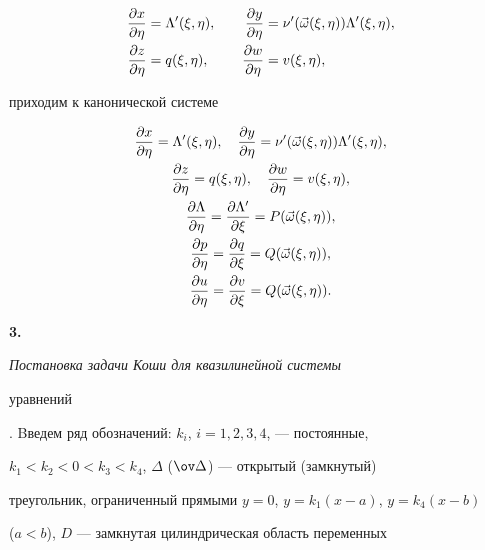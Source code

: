 \begin{alignat*}{2} 


\myfrac{x}{\eta}&=\Lambda'(\xi,\eta), &\quad 


\myfrac{y}{\eta}&=\nu'(\Vec\omega(\xi,\eta)) 


\Lambda'(\xi,\eta), \\ 


% 


\myfrac{z}{\eta}&=q(\xi,\eta), &\quad 


\myfrac{w}{\eta}&=v(\xi,\eta), 


\end{alignat*} 


приходим к канонической системе 


\begin{gather} 


\myfrac{x}{\eta}=\Lambda'(\xi,\eta),\quad 


\myfrac{y}{\eta}=\nu'(\Vec\omega(\xi,\eta))\Lambda'(\xi,\eta),\notag\\ 


% 


\myfrac{z}{\eta}=q(\xi,\eta),\quad 


\myfrac{w}{\eta}=v(\xi,\eta),\notag \\ 


\myfrac{\Lambda}{\eta}=\myfrac{\Lambda'}{\xi}= 


P(\Vec\omega(\xi,\eta)), \\ 


% 


\myfrac{p}{\eta}=\myfrac{q}{\xi}=Q(\Vec\omega(\xi,\eta)),\notag \\ 


% 


\myfrac{u}{\eta}=\myfrac{v}{\xi}=Q(\Vec\omega(\xi,\eta)).\notag 


\end{gather} 


 


{\bf 3.} {\it Постановка задачи Коши для квазилинейной системы 


уравнений}. Bведем ряд обозначений: $k_i$, $i=1,2,3,4$, --- постоянные, 


$k_1<k_2<0<k_3<k_4$, $\Delta$ ($\ov\Delta$) --- открытый (замкнутый) 


треугольник, ограниченный прямыми $y=0$, $y=k_1(x-a)$, $y=k_4(x-b)$ 


($a<b$), $D$ --- замкнутая цилиндрическая область переменных 


